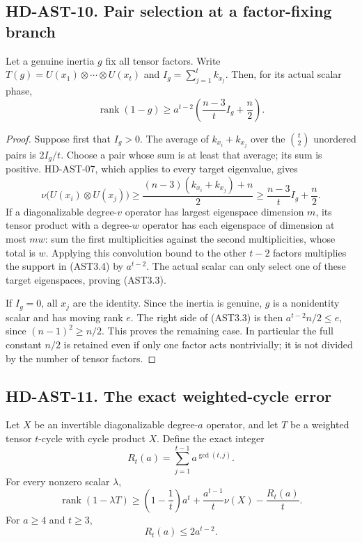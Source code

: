 \subsection*{HD-AST-10. Pair selection at a factor-fixing branch}

\begin{lemma}[HD-AST-10]
Let a genuine inertia $g$ fix all tensor factors.  Write
$T(g)=U(x_1)\otimes\cdots\otimes U(x_t)$ and
$I_g=\sum_{j=1}^t k_{x_j}$.  Then, for its actual scalar phase,
\[
 \operatorname{rank}(1-g)\ge
 a^{t-2}\left(\frac{n-3}{t}I_g+\frac n2\right).                \tag{AST3.3}
\]
\end{lemma}

\begin{proof}
Suppose first that $I_g>0$.  The average of $k_{x_i}+k_{x_j}$
over the $\binom t2$ unordered pairs is $2I_g/t$.  Choose a pair
whose sum is at least that average; its sum is positive.
HD-AST-07, which applies to every target eigenvalue, gives
\[
 \nu\bigl(U(x_i)\otimes U(x_j)\bigr)
 \ge\frac{(n-3)(k_{x_i}+k_{x_j})+n}{2}
 \ge\frac{n-3}{t}I_g+\frac n2.                               \tag{AST3.4}
\]
If a diagonalizable degree-$v$ operator has largest eigenspace
dimension $m$, its tensor product with a degree-$w$ operator has
each eigenspace of dimension at most $mw$: sum the first
multiplicities against the second multiplicities, whose total is
$w$.  Applying this convolution bound to the other $t-2$ factors
multiplies the support in (AST3.4) by $a^{t-2}$.  The actual
scalar can only select one of these target eigenspaces, proving
(AST3.3).

If $I_g=0$, all $x_j$ are the identity.  Since the inertia is
genuine, $g$ is a nonidentity scalar and has moving rank $e$.
The right side of (AST3.3) is then $a^{t-2}n/2\le e$, since
$(n-1)^2\ge n/2$.  This proves the remaining case.  In particular
the full constant $n/2$ is retained even if only one factor acts
nontrivially; it is not divided by the number of tensor factors.
\end{proof}

\subsection*{HD-AST-11. The exact weighted-cycle error}

\begin{lemma}
Let $X$ be an invertible diagonalizable degree-$a$ operator, and
let $T$ be a weighted tensor $t$-cycle with cycle product $X$.
Define the exact integer
\[
                 R_t(a)=\sum_{j=1}^{t-1}a^{\gcd(t,j)}.          \tag{AST3.5}
\]
For every nonzero scalar $\lambda$,
\[
 \operatorname{rank}(1-\lambda T)\ge
 \left(1-\frac1t\right)a^t+\frac{a^{t-1}}t\nu(X)
                          -\frac{R_t(a)}t.                    \tag{AST3.6}
\]
For $a\ge4$ and $t\ge3$,
\[
                          R_t(a)\le2a^{t-2}.                  \tag{AST3.7}
\]
\end{lemma}

